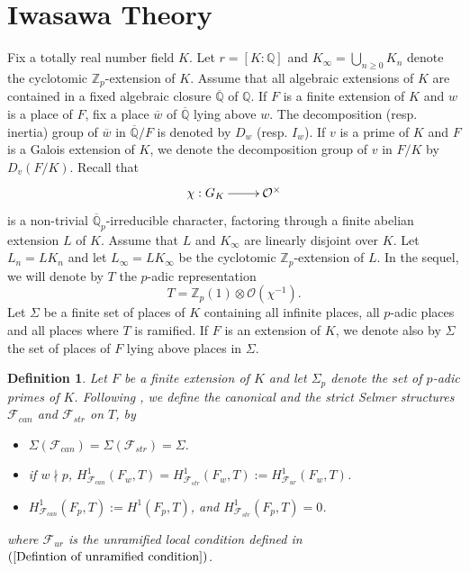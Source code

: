 \documentclass[reqno]{amsart}
\newcounter{dummy} \numberwithin{dummy}{section}
\newtheorem{deft}[dummy]{Definition}
\begin{document}
\section{\bf Iwasawa Theory}
 Fix a totally real number field $K$. Let $r=[K:\mathbb{Q}]$ and
$K_{\infty}=\bigcup_{n\geq 0}K_{n}$ denote the cyclotomic
$\mathbb{Z}_{p}$-extension of $K$. Assume that all algebraic
extensions of $K$ are contained in a fixed  algebraic closure
$\overline{\mathbb{Q}}$ of $\mathbb{Q}$. If $F$ is a finite
extension of $K$ and $w$ is a place of $F$, fix a place
$\overline{w}$ of $\overline{\mathbb{Q}}$ lying above $w$. The
decomposition (resp. inertia) group of $\overline{w}$ in
$\overline{\mathbb{Q}}/F$ is denoted  by $D_{w}$ (resp. $I_{w}$). If
$v$ is a prime of $K$ and $F$ is a Galois extension of $K$, we
denote the decomposition group of $v$ in $F/K$ by $D_{v}(F/K)$.
Recall that
$$
\xymatrix@=2pc{ \chi : G_{K}\ar[r]& \mathcal{O}^{\times}}
$$
is a non-trivial $\overline{\mathbb{Q}}_{p}$-irreducible character,
factoring through a finite abelian  extension $L$ of $K$. Assume
that $L$ and $K_{\infty}$ are linearly disjoint over $K$. Let
$L_{n}=LK_{n}$ and let $L_{\infty}=LK_{\infty}$ be the cyclotomic
$\mathbb{Z}_{p}$-extension of $L$. In the sequel, we will denote by
$T$ the $p$-adic representation
$$
T=\mathbb{Z}_{p}(1)\otimes \mathcal{O}(\chi^{-1}).
$$
Let $\Sigma$ be a finite set of places of $K$ containing all
infinite places, all $p$-adic places and all places where $T$ is
ramified. If $F$ is an extension of $K$, we denote also by $\Sigma$
the set of places of $F$ lying above places in $\Sigma$.
\begin{deft}\label{definition of canonical and strict conditions}
Let $F$ be a finite extension of $K$ and let $\Sigma_{p}$ denote the
set of $p$-adic primes of $K$. Following \cite[Example 5.1]{MR 16},
we define the canonical
 and the strict Selmer structures $\mathcal{F}_{can}$ and
$\mathcal{F}_{str}$ on $T$, by
\begin{itemize}
    \item
    $\Sigma(\mathcal{F}_{can})=\Sigma(\mathcal{F}_{str})=\Sigma$.
    \item if $w\nmid p$,
    $H^{1}_{\mathcal{F}_{can}}(F_{w},T)=H^{1}_{\mathcal{F}_{str}}(F_{w},T):=H^{1}_{\mathcal{F}_{ur}}(F_{w},T)$.
    \item $H^{1}_{\mathcal{F}_{can}}(F_{p},T):=H^{1}(F_{p},T)$, and
    $H^{1}_{\mathcal{F}_{str}}(F_{p},T)=0$.
\end{itemize}
where $\mathcal{F}_{ur}$ is the unramified local condition defined
in $(\ref{Defintion of unramified condition})$.
\end{deft}
\end{document}
